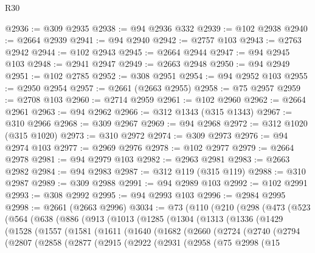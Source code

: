 \begin{lexlean}{R30}
\begin{coremodule}
@2936 := @309 @2935
@2938 := @94 @2936 @332
@2939 := @102 @2938
@2940 := @2664 @2939
@2941 := @94 @2940
@2942 := @2757 @103
@2943 := @2763 @2942
@2944 := @102 @2943
@2945 := @2664 @2944
@2947 := @94 @2945 @103
@2948 := @2941 @2947
@2949 := @2663 @2948
@2950 := @94 @2949
@2951 := @102 @2785
@2952 := @308 @2951
@2954 := @94 @2952 @103
@2955 := @2950 @2954
@2957 := @2661 (@2663 @2955)
@2958 := @75 @2957
@2959 := @2708 @103
@2960 := @2714 @2959
@2961 := @102 @2960
@2962 := @2664 @2961
@2963 := @94 @2962
@2966 := @312 @1343 (@315 @1343)
@2967 := @310 @2966
@2968 := @309 @2967
@2969 := @94 @2968
@2972 := @312 @1020 (@315 @1020)
@2973 := @310 @2972
@2974 := @309 @2973
@2976 := @94 @2974 @103
@2977 := @2969 @2976
@2978 := @102 @2977
@2979 := @2664 @2978
@2981 := @94 @2979 @103
@2982 := @2963 @2981
@2983 := @2663 @2982
@2984 := @94 @2983
@2987 := @312 @119 (@315 @119)
@2988 := @310 @2987
@2989 := @309 @2988
@2991 := @94 @2989 @103
@2992 := @102 @2991
@2993 := @308 @2992
@2995 := @94 @2993 @103
@2996 := @2984 @2995
@2998 := @2661 (@2663 @2996)
@3034 := @73
    (@110
      (@210
        (@298
          (@473
            (@523
              (@564
                (@638
                  (@886
                    (@913
                      (@1013
                        (@1285
                          (@1304
                            (@1313
                              (@1336
                                (@1429
                                  (@1528
                                    (@1557
                                      (@1581
                                        (@1611
                                          (@1640
                                            (@1682
                                              (@2660
                                                (@2724
                                                  (@2740
                                                    (@2794
                                                      (@2807
                                                        (@2858
                                                          (@2877
                                                            (@2915
                                                              (@2922
                                                                (@2931
                                                                  (@2958
                                                                    (@75
                                                                      @2998
                                                                      (@15

\end{coremodule}
\end{lexlean}
